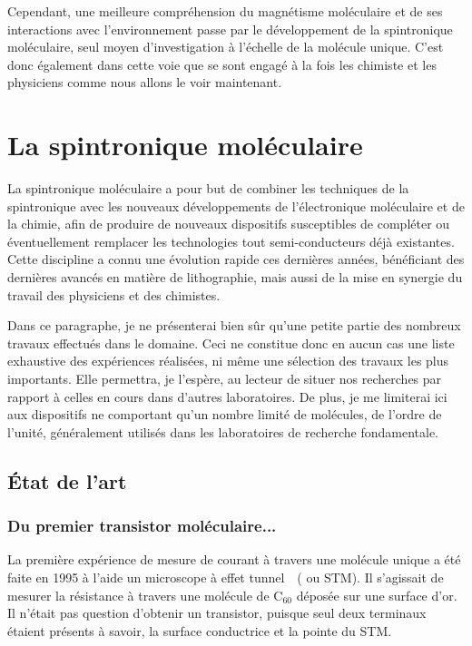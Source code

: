 Cependant, une meilleure compréhension du magnétisme moléculaire et de ses interactions avec l’environnement passe par le développement de la spintronique moléculaire, seul moyen d'investigation à l'échelle de la molécule unique. C'est donc également dans cette voie que se sont engagé à la fois les chimiste et les physiciens comme nous allons le voir maintenant.


\section{La spintronique moléculaire}
La spintronique moléculaire a pour but de combiner les techniques de la spintronique avec les nouveaux développements de l'électronique moléculaire et de la chimie, afin de produire de nouveaux dispositifs susceptibles de compléter ou éventuellement remplacer les technologies tout semi-conducteurs déjà existantes. Cette discipline a connu une évolution rapide ces dernières années, bénéficiant des dernières avancés en matière de lithographie, mais aussi de la mise en synergie du travail des physiciens et des chimistes. 

Dans ce paragraphe, je ne présenterai bien sûr qu'une petite partie des nombreux travaux effectués dans le domaine. Ceci ne constitue donc en aucun cas une liste exhaustive des expériences réalisées, ni m\^eme une sélection des travaux les plus importants. Elle permettra, je l'espère, au lecteur de situer nos recherches par rapport à celles en cours dans d'autres laboratoires. De plus, je me limiterai ici aux dispositifs ne comportant qu'un nombre limité de molécules, de l'ordre de l'unité, généralement utilisés dans les laboratoires de recherche fondamentale.
\subsection{État de l'art}

\subsubsection*{Du premier transistor moléculaire...}
La première expérience de mesure de courant à travers une molécule unique a été faite en 1995 à l'aide un microscope à effet tunnel~\cite{Joachim1995}~( ou STM). Il s'agissait de mesurer la résistance à travers une molécule de C$_{60}$ déposée sur une surface d'or. Il n'était pas question d'obtenir un transistor, puisque seul deux terminaux étaient présents à savoir, la surface conductrice et la pointe du STM.

